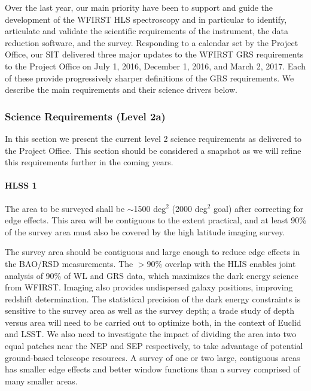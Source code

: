  \begin{summaryii}
   Over the last year, our main priority have been to support and guide the development of the WFIRST HLS spectroscopy and in particular to identify, articulate and validate the scientific requirements of the instrument, the data reduction software, and the survey. Responding to a calendar set by the Project Office, our SIT delivered three major updates to the WFIRST GRS requirements to the Project Office on July 1, 2016, December 1, 2016, and March 2, 2017. Each of these provide progressively sharper definitions of the  GRS requirements. We describe the main requirements and their science drivers below.
 \end{summaryii}


 \subsubsection{Science Requirements (Level 2a)} In this section we present the current level 2 science requirements as delivered to the Project Office. This section should be considered a snapshot as we will refine this requirements further in the coming years.
\label{sec:sr2a_grs}

 \paragraph{HLSS 1} The area to be surveyed shall be $\sim$1500 deg$^2$ (2000 deg$^2$ goal) after correcting for edge effects.  This area will be contiguous to the extent practical, and at least 90\% of the survey area must also be covered by the high latitude imaging survey.

 The survey area should be contiguous and large enough to reduce edge effects in
 the BAO/RSD measurements.  The $>90\%$ overlap with the HLIS enables joint
 analysis of 90\% of WL and GRS data, which maximizes the dark energy science
 from WFIRST.  Imaging also provides undispersed galaxy positions, improving
 redshift determination.  The statistical precision of the dark energy
 constraints is sensitive to the survey area as well as the survey depth; a trade
 study of depth versus area will need to be carried out to optimize both, in the
 context of Euclid and LSST. We also need to investigate the impact of dividing
 the area into two equal patches near the NEP and SEP respectively, to take
 advantage of potential ground-based telescope resources.  A survey of one or
 two large, contiguous areas has smaller edge effects and better window functions
 than a survey comprised of many smaller areas.

